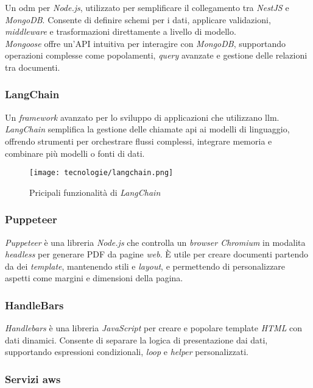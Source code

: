 Un \gls{odm} per \textit{Node.js}, utilizzato per semplificare il collegamento tra \textit{NestJS} e \textit{MongoDB}. Consente di definire schemi per i dati, applicare validazioni, \textit{middleware} e trasformazioni direttamente a livello di modello. \\
\textit{Mongoose} offre un'API intuitiva per interagire con \textit{MongoDB}, supportando operazioni complesse come popolamenti, \textit{query} avanzate e gestione delle relazioni tra documenti. 

\subsubsection{LangChain}

Un \textit{framework} avanzato per lo sviluppo di applicazioni che utilizzano \gls{llm}. 
\textit{LangChain} semplifica la gestione delle chiamate \gls{api} ai modelli di linguaggio, offrendo strumenti per orchestrare flussi complessi, integrare memoria e combinare più modelli o fonti di dati.

\begin{figure}[H]
    \label{fig:langchain-usecases}
    \centering
    \texttt{[image: tecnologie/langchain.png]}
    \caption{Pricipali funzionalità di \textit{LangChain}}
\end{figure}
\subsubsection{Puppeteer}

\textit{Puppeteer} è una libreria \textit{Node.js} che controlla un \textit{browser Chromium} in modalita \textit{headless} per generare PDF da pagine \textit{web}.
È utile per creare documenti partendo da dei \textit{template}, mantenendo stili e \textit{layout}, e permettendo di personalizzare aspetti come margini e dimensioni della pagina.

\subsubsection{HandleBars}

\textit{Handlebars} è una libreria \textit{JavaScript} per creare e popolare template \textit{HTML} con dati dinamici. 
Consente di separare la logica di presentazione dai dati, supportando espressioni condizionali, \textit{loop} e \textit{helper} personalizzati.

\subsubsection{Servizi \gls{aws}}

